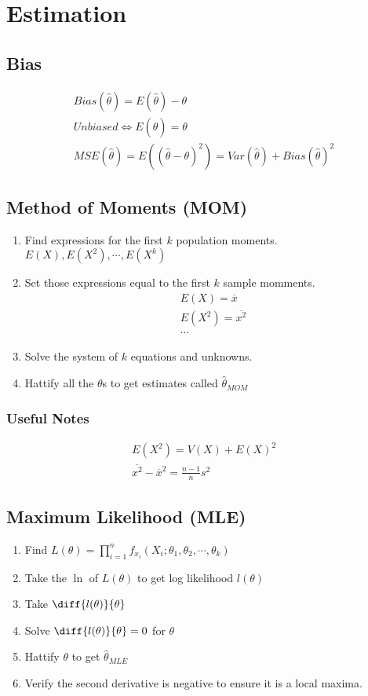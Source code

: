 \section{Estimation}
\subsection{Bias}
\begin{align}
  Bias(\hat{\theta}) = E(\hat{\theta}) - \theta \\
  Unbiased \iff E(\hat{\theta}) = \theta \\
  MSE(\hat{\theta}) = E((\hat{\theta} - \theta)^2) = Var(\hat{\theta}) + Bias(\hat{\theta})^2
\end{align}

\subsection{Method of Moments (MOM)}
\begin{enumerate}
\item Find expressions for the first $k$ population moments. $E(X), E(X^2), \cdots, E(X^k)$
\item Set those expressions equal to the first $k$ sample momments.
  \begin{align}
    E(X) = \overbar{x} \\
    E(X^2) = \overbar{x^2} \\
    \cdots
  \end{align}
\item Solve the system of $k$ equations and unknowns.
\item Hattify all the $\theta$s to get estimates called $\hat{\theta}_{MOM}$
\end{enumerate}

\subsubsection{Useful Notes}
\begin{align}
  E(X^2) = V(X) + E(X)^2 \\
  \overbar{x^2} - \overbar{x}^2 = \frac{n - 1}{n}s^2
\end{align}

\subsection{Maximum Likelihood (MLE)}
\begin{enumerate}
\item Find $L(\theta) = \prod_{i=1}^n f_{x_i}(X_i; \theta_1, \theta_2, \cdots, \theta_k)$
\item Take the $\ln$ of $L(\theta)$ to get log likelihood $l(\theta)$
\item Take $\diff{l(\theta)}{\theta}$
\item Solve $\diff{l(\theta)}{\theta} = 0$ for $\theta$
\item Hattify $\theta$ to get $\hat{\theta}_{MLE}$
\item Verify the second derivative is negative to ensure it is a local maxima.
\end{enumerate}

